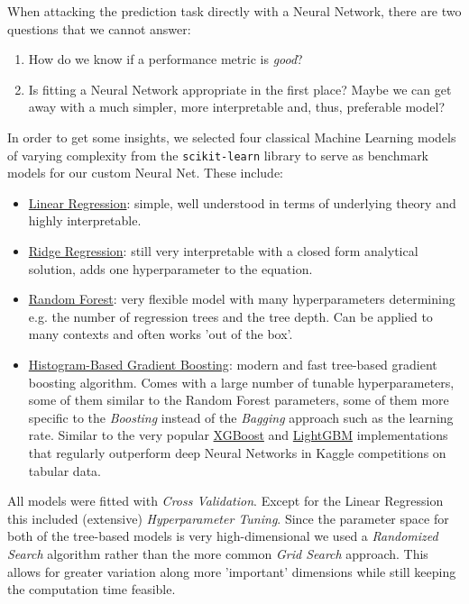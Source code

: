\documentclass[12pt, letterpaper]{article}
\begin{document}
When attacking the prediction task directly with a Neural Network, there are two questions that we cannot answer:
\begin{enumerate}
    \item How do we know if a performance metric is \emph{good}?
    \item Is fitting a Neural Network appropriate in the first place?
          Maybe we can get away with a much simpler, more interpretable and, thus, preferable model?
\end{enumerate}
In order to get some insights, we selected four classical Machine Learning models of varying complexity from the \texttt{scikit-learn} library to serve as benchmark models for our custom Neural Net.
These include:
\begin{itemize}
    \item \href{https://scikit-learn.org/stable/modules/generated/sklearn.linear_model.LinearRegression.html}{Linear Regression}: simple, well understood in terms of underlying theory and highly interpretable.
    \item \href{https://scikit-learn.org/stable/modules/generated/sklearn.linear_model.Ridge.html}{Ridge Regression}: still very interpretable with a closed form analytical solution, adds one hyperparameter to the equation.
    \item \href{https://scikit-learn.org/stable/modules/generated/sklearn.ensemble.RandomForestRegressor.html}{Random Forest}: very flexible model with many hyperparameters determining e.g. the number of regression trees and the tree depth.
          Can be applied to many contexts and often works 'out of the box'.
    \item \href{https://scikit-learn.org/stable/modules/generated/sklearn.ensemble.HistGradientBoostingRegressor.html}{Histogram-Based Gradient Boosting}: modern and fast tree-based gradient boosting algorithm.
          Comes with a large number of tunable hyperparameters, some of them similar to the Random Forest parameters, some of them more specific to the \emph{Boosting} instead of the \emph{Bagging} approach such as the learning rate.
          Similar to the very popular \href{https://xgboost.readthedocs.io/en/stable/}{XGBoost} and \href{https://lightgbm.readthedocs.io/en/latest/}{LightGBM} implementations that regularly outperform deep Neural Networks in Kaggle competitions on tabular data.
\end{itemize}

All models were fitted with \emph{Cross Validation}.
Except for the Linear Regression this included (extensive) \emph{Hyperparameter Tuning}.
Since the parameter space for both of the tree-based models is very high-dimensional we used a \emph{Randomized Search} algorithm rather than the more common \emph{Grid Search} approach.
This allows for greater variation along more 'important' dimensions while still keeping the computation time feasible.
\end{document}
